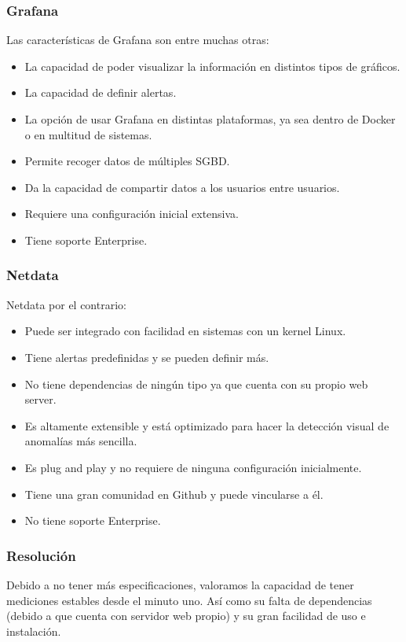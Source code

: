 \documentclass[11pt]{article}
\begin{document}
\subsubsection{Grafana}
\label{sec:orga645c0e}
Las características de Grafana son entre muchas otras: 
\begin{itemize}
\item La capacidad de poder visualizar la información en distintos tipos de gráficos.
\item La capacidad de definir alertas.
\item La opción de usar Grafana en distintas plataformas, ya sea dentro de Docker o en multitud de sistemas.
\item Permite recoger datos de múltiples SGBD.
\item Da la capacidad de compartir datos a los usuarios entre usuarios.
\item Requiere una configuración inicial extensiva.
\item Tiene soporte Enterprise.
\end{itemize}

\subsubsection{Netdata}
\label{sec:org08c880d}
Netdata por el contrario:
\begin{itemize}
\item Puede ser integrado con facilidad en sistemas con un kernel Linux.
\item Tiene alertas predefinidas y se pueden definir más.
\item No tiene dependencias de ningún tipo ya que cuenta con su propio web server.
\item Es altamente extensible y está optimizado para hacer la detección visual de anomalías más sencilla.
\item Es plug and play y no requiere de ninguna configuración inicialmente.
\item Tiene una gran comunidad en Github y puede vincularse a él.
\item No tiene soporte Enterprise.
\end{itemize}

\subsubsection{Resolución}
\label{sec:orgb932536}
Debido a no tener más especificaciones, valoramos la capacidad de tener mediciones estables desde el minuto uno. Así como su falta de dependencias (debido a que cuenta con servidor web propio) y su gran facilidad de uso e instalación.
\end{document}
